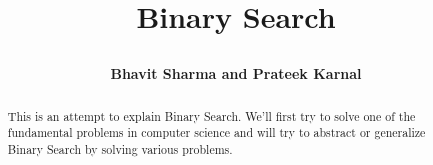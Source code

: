 \documentclass[12pt]{article}
\title{\begin{Huge}
Binary Search
\end{Huge}}
\author{\textbf{Bhavit Sharma and Prateek Karnal}
}
\begin{document}
\maketitle
\thispagestyle{empty}

\begin{abstract}
\begin{large}
This is an attempt to explain Binary Search. We'll first try to solve one of the fundamental problems in computer science and will try to abstract or generalize Binary Search by solving various problems. 
\end{large}
\end{abstract}

\begin{Large}
\tableofcontents
\end{Large}

\newpage
\setcounter{page}{1}
\end{document}
